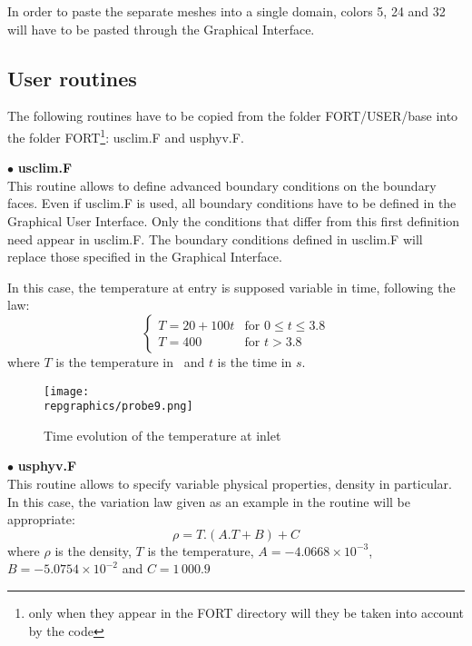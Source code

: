 In order to paste the separate meshes into a single domain, colors 5, 24 and 32
will have to be pasted through the Graphical Interface.


	\subsection{User routines}

The following routines have to be copied from the folder FORT/USER/base into the
folder FORT\footnote{only when they appear in the FORT directory will they be
taken into account by the code}: usclim.F and usphyv.F.
	
$\bullet$ {\bfseries usclim.F}\\
This routine allows to define advanced boundary conditions on the boundary
faces. Even if usclim.F is used, all boundary conditions have to be defined in
the Graphical User Interface. Only the conditions that differ from this first
definition need appear in usclim.F. The boundary conditions defined in usclim.F
will replace those specified in the Graphical Interface.

In this case, the temperature at entry is supposed variable in time, following
the law:
\begin{equation}
\left\{\begin{array}{ll}
T = 20 + 100t & \text{for }0\leqslant t \leqslant 3.8\\ 
T = 400 & \text{for } t > 3.8
\end{array}\right.
\end{equation}
where $T$ is the temperature in \degresC\ and $t$ is the time in $s$.


\begin{figure}[h!]
\begin{center}
\texttt{[image: \\repgraphics/probe9.png]} 
\caption{Time evolution of the temperature at inlet}
\label{figp9_e3}
\end{center}
\end{figure}


$\bullet$ {\bfseries usphyv.F}\\
This routine allows to specify variable physical properties, density in
particular. In this case, the variation law given as an example in the routine
will be appropriate:
\begin{equation}
\rho = T.(A.T + B) + C
\end{equation}
where $\rho$ is the density, $T$ is the temperature, $A = -4.0668\times10^{-3}$,
$B =-5.0754\times 10^{-2}$ and $C = 1\,000.9$ 


